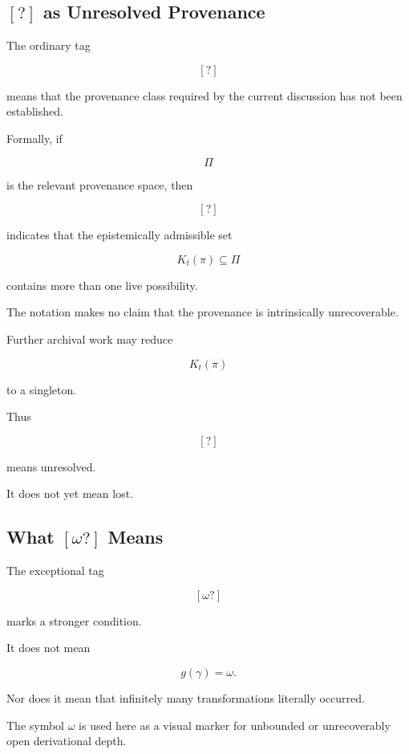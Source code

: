 \documentclass[
  11pt,
  a4paper,
  DIV=12,
  BCOR=0mm,
  parskip=half-
]{scrartcl}
\theoremstyle{definition}
\theoremstyle{plain}
\theoremstyle{remark}
\begin{document}
\subsection{\texorpdfstring{$[?]$}{[?]} as Unresolved Provenance}
\label{app:ordinary-uncertainty}

The ordinary tag

\[
  [?]
\]

means that the provenance class required by the current discussion has not
been established.

Formally, if

\[
  \Pi
\]

is the relevant provenance space, then

\[
  [?]
\]

indicates that the epistemically admissible set

\[
  K_t(\pi)
  \subseteq
  \Pi
\]

contains more than one live possibility.

The notation makes no claim that the provenance is intrinsically
unrecoverable.

Further archival work may reduce

\[
  K_t(\pi)
\]

to a singleton.

Thus

\[
  [?]
\]

means unresolved.

It does not yet mean lost.


\subsection{What \texorpdfstring{$[\omega?]$}{[omega?]} Means}
\label{app:omega-question}

The exceptional tag

\[
  [\omega?]
\]

marks a stronger condition.

It does not mean

\[
  g(\gamma)=\omega.
\]

Nor does it mean that infinitely many transformations literally occurred.

The symbol \(\omega\) is used here as a visual marker for unbounded or
unrecoverably open derivational depth.
\end{document}
